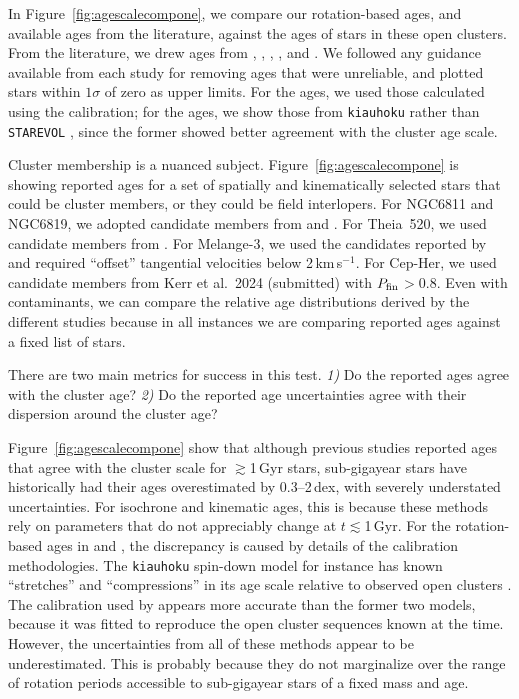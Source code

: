 \documentclass[11pt,twocolumn,tighten]{aastex63}
\newcommand{\kms}{{km\,s$^{-1}$}}
\begin{document}
In Figure~\ref{fig:agescalecompone}, we compare our rotation-based
ages, and available ages from the literature, against the ages of
stars in these open clusters. 
From the literature, we
drew ages from \citet{Reinhold_2015}, \citet{Berger_2020a_catalog},
\citet{2021AJ....161..189L}, \citet{2023ApJ...952..131M}, and
\citet{2024AJ....167..159L}.  We followed any guidance available from
each study for removing ages that were unreliable, and plotted stars
within $1\sigma$ of zero as upper limits.  For the
\citeauthor{Reinhold_2015} ages, we used those calculated using the
\citet{Mamajek_2008} calibration; for the
\citeauthor{2023ApJ...952..131M} ages, we show those from
\texttt{kiauhoku} \citep{Claytor2020} rather than \texttt{STAREVOL}
\citep{Amard2019}, since the former showed better agreement with the
cluster age scale.

Cluster membership is a nuanced subject.
Figure~\ref{fig:agescalecompone} is showing reported ages for a set of
spatially and kinematically selected stars that could be cluster
members, or they could be field interlopers.  For NGC6811 and NGC6819,
we adopted candidate members from
\citet{2018A&A...618A..93C,CantatGaudin_2020} and
\citet{Kounkel_2020}.  For Theia~520, we used candidate members from
\citet{Kounkel_2020}.  For Melange-3, we used the candidates reported
by \citet{Barber_2022} and required ``offset'' tangential velocities
below 2\,\kms.  For Cep-Her, we used candidate members from Kerr et
al.~2024 (submitted) with $P_{\rm fin}$$>$0.8.  Even with
contaminants, we can compare the relative age distributions derived by
the different studies because in all instances we are comparing
reported ages against a fixed list of stars.

There are two main metrics for success in this test. {\it 1)} Do the
reported ages agree with the cluster age? {\it 2)} Do the reported age
uncertainties agree with their dispersion around the cluster age?

Figure~\ref{fig:agescalecompone} show that although previous studies
reported ages that agree with the cluster scale for $\gtrsim$1\,Gyr
stars, sub-gigayear stars have historically had their ages
overestimated by 0.3--2\,dex, with severely understated uncertainties.
For isochrone and kinematic ages, this is because these methods rely
on parameters that do not appreciably change at $t$$\lesssim$1\,Gyr.
For the rotation-based ages in \citet{2023ApJ...952..131M} and
\citet{2024AJ....167..159L}, the discrepancy is caused by details of
the calibration methodologies.  The \texttt{kiauhoku} spin-down model
for instance has known ``stretches'' and ``compressions'' in its age
scale relative to observed open clusters \citep[see][Sec.
7.3]{2023ApJ...952..131M}.  The \citet{Mamajek_2008} calibration used
by \citet{Reinhold_2015} appears more accurate than the former two
models, because it was fitted to reproduce the open cluster sequences
known at the time.  However, the uncertainties from all of these
methods appear to be underestimated.  This is probably because they do
not marginalize over the range of rotation periods accessible to
sub-gigayear stars of a fixed mass and age.
\end{document}

